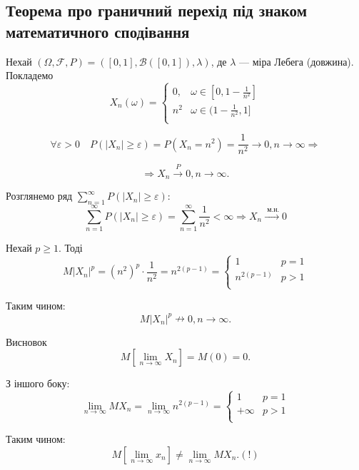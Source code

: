 \subsection{Теорема про граничний перехід під знаком математичного сподівання}

\begin{example}
    Нехай $(\Omega, \mathcal{F}, P) = ([0, 1], \mathcal{B}([0, 1]), \lambda)$,
    де $\lambda$ --- міра Лебега (довжина).
    Покладемо
    $$X_n(\omega) = \left\{ \begin{array}{ll}
        0,  & \omega \in [0, 1 - \frac{1}{n^2}] \\
        n^2 & \omega \in (1 - \frac{1}{n^2}, 1] \\
    \end{array} \right.$$
    
    \beautifulImage

    $$\forall \varepsilon > 0 \quad P(|X_n| \geqslant \varepsilon)
    = P(X_n = n^2)
    = \frac{1}{n^2} \rightarrow 0, n \rightarrow \infty \Rightarrow$$

    $$\Rightarrow X_n \xrightarrow{P} 0, n \rightarrow \infty.$$

    Розглянемо ряд $\sum\limits_{n=1}^{\infty} P(|X_n| \geqslant \varepsilon)$:
    $$\sum\limits_{n=1}^{\infty} P(|X_n| \geqslant \varepsilon)
    = \sum\limits_{n=1}^{\infty} \frac{1}{n^2}
    < \infty
    \Rightarrow X_n \xrightarrow{\text{ м.н.}} 0$$

    Нехай $p \geqslant 1$. Тоді
    $$M|X_n|^p
    = (n^2)^p \cdot \frac{1}{n^2}
    = n^{2(p-1)}
    = \left\{ \begin{array}{ll}
        1 & p = 1 \\
        n^{2(p-1)} & p > 1 \\
    \end{array} \right.$$

    Таким чином:
    $$M|X_n|^p \nrightarrow 0, n \rightarrow \infty.$$

    Висновок
    $$M[\lim\limits_{n \rightarrow \infty} X_n]
    = M(0)
    = 0.$$

    З іншого боку:
    $$\lim\limits_{n \rightarrow \infty} MX_n
    = \lim\limits_{n \rightarrow \infty} n^{2(p-1)}
    = \left\{ \begin{array}{ll}
        1 & p=1 \\
        + \infty & p>1 \\
    \end{array} \right.$$

    Таким чином:
    $$M[\lim\limits_{n \rightarrow \infty} x_n]
    \neq \lim\limits_{n \rightarrow \infty} MX_n. (!)$$
\end{example}

